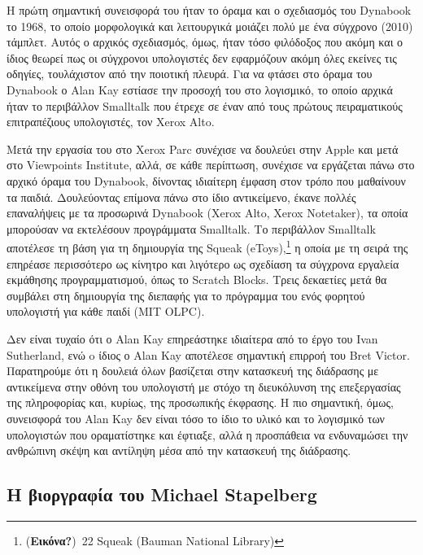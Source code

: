 \documentclass[
]{article}
\begin{document}
Η πρώτη σημαντική συνεισφορά του ήταν το όραμα και ο σχεδιασμός του
Dynabook το 1968, το οποίο μορφολογικά και λειτουργικά μοιάζει πολύ με
ένα σύγχρονο (2010) τάμπλετ. Αυτός ο αρχικός σχεδιασμός, όμως, ήταν τόσο
φιλόδοξος που ακόμη και ο ίδιος θεωρεί πως οι σύγχρονοι υπολογιστές δεν
εφαρμόζουν ακόμη όλες εκείνες τις οδηγίες, τουλάχιστον από την ποιοτική
πλευρά. Για να φτάσει στο όραμα του Dynabook ο Alan Kay εστίασε την
προσοχή του στο λογισμικό, το οποίο αρχικά ήταν το περιβάλλον Smalltalk
που έτρεχε σε έναν από τους πρώτους πειραματικούς επιτραπέζιους
υπολογιστές, τον Xerox Alto.

Μετά την εργασία του στο Xerox Parc συνέχισε να δουλεύει στην Apple και
μετά στο Viewpoints Institute, αλλά, σε κάθε περίπτωση, συνέχισε να
εργάζεται πάνω στο αρχικό όραμα του Dynabook, δίνοντας ιδιαίτερη έμφαση
στον τρόπο που μαθαίνουν τα παιδιά. Δουλεύοντας επίμονα πάνω στο ίδιο
αντικείμενο, έκανε πολλές επαναλήψεις με τα προσωρινά Dynabook (Xerox
Alto, Xerox Notetaker), τα οποία μπορούσαν να εκτελέσουν προγράμματα
Smalltalk. Το περιβάλλον Smalltalk αποτέλεσε τη βάση για τη δημιουργία
της Squeak (eToys),\footnote{(\textbf{Εικόνα?})~22 Squeak (Bauman
  National Library)} η οποία με τη σειρά της επηρέασε περισσότερο ως
κίνητρο και λιγότερο ως σχεδίαση τα σύγχρονα εργαλεία εκμάθησης
προγραμματισμού, όπως το Scratch Blocks. Τρεις δεκαετίες μετά θα
συμβάλει στη δημιουργία της διεπαφής για το πρόγραμμα του ενός φορητού
υπολογιστή για κάθε παιδί (MIT OLPC).

Δεν είναι τυχαίο ότι ο Alan Kay επηρεάστηκε ιδιαίτερα από το έργο του
Ivan Sutherland, ενώ o ίδιος ο Alan Kay αποτέλεσε σημαντική επιρροή του
Bret Victor. Παρατηρούμε ότι η δουλειά όλων βασίζεται στην κατασκευή της
διάδρασης με αντικείμενα στην οθόνη του υπολογιστή με στόχο τη
διευκόλυνση της επεξεργασίας της πληροφορίας και, κυρίως, της προσωπικής
έκφρασης. Η πιο σημαντική, όμως, συνεισφορά του Alan Kay δεν είναι τόσο
το ίδιο το υλικό και το λογισμικό των υπολογιστών που οραματίστηκε και
έφτιαξε, αλλά η προσπάθεια να ενδυναμώσει την ανθρώπινη σκέψη και
αντίληψη μέσα από την κατασκευή της διάδρασης.

\hypertarget{ux3b7-ux3b2ux3b9ux3bfux3c1ux3b3ux3c1ux3b1ux3c6ux3afux3b1-ux3c4ux3bfux3c5-michael-stapelberg}{%
\subsection{Η βιοργραφία του Michael
Stapelberg}\label{ux3b7-ux3b2ux3b9ux3bfux3c1ux3b3ux3c1ux3b1ux3c6ux3afux3b1-ux3c4ux3bfux3c5-michael-stapelberg}}
\end{document}
